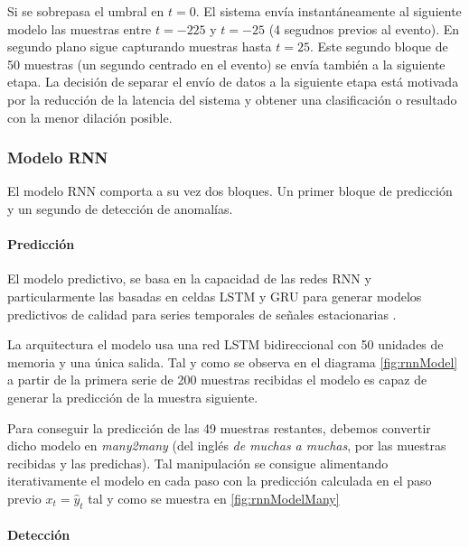 \documentclass[../tfm.tex]{subfiles}
\begin{document}
Si se sobrepasa el umbral en $t=0$. El sistema envía instantáneamente al siguiente modelo las muestras entre $t=-225$ y $t=-25$ (4 segudnos previos al evento). En segundo plano sigue capturando muestras hasta $t=25$. Este segundo bloque de 50 muestras (un segundo centrado en el evento) se envía también a la siguiente etapa. La decisión de separar el envío de datos a la siguiente etapa está motivada por la reducción de la latencia del sistema y obtener una clasificación o resultado con la menor dilación posible.


\subsubsection{Modelo RNN}

El modelo RNN comporta a su vez dos bloques. Un primer bloque de predicción y un segundo de detección de anomalías.

\paragraph*{Predicción}


El modelo predictivo, se basa en la capacidad de las redes RNN y particularmente las basadas en celdas LSTM y GRU para generar modelos predictivos de calidad para series temporales de señales estacionarias \cite{Qin2019}.

La arquitectura el modelo usa una red LSTM bidireccional con 50 unidades de memoria y una única salida. Tal y como se observa en el diagrama \ref{fig:rnnModel} a partir de la primera serie de 200 muestras recibidas el modelo es capaz de generar la predicción de la muestra siguiente.

Para conseguir la predicción de las 49 muestras restantes, debemos convertir dicho modelo en \textit{many2many} (del inglés \textit{de muchas a muchas}, por las muestras recibidas y las predichas). Tal manipulación se consigue alimentando iterativamente el modelo en cada paso con la predicción calculada en el paso previo $x_{t} = \hat{y}_t$ tal y como se muestra en \ref{fig:rnnModelMany}


\paragraph*{Detección}
\end{document}
